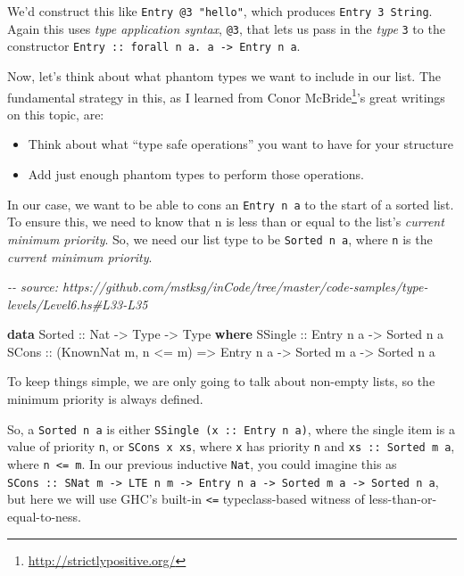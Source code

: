 \documentclass[]{article}
\newenvironment{Shaded}{}{}
\newcommand{\CommentTok}[1]{\textcolor[rgb]{0.38,0.63,0.69}{\textit{#1}}}
\newcommand{\DataTypeTok}[1]{\textcolor[rgb]{0.56,0.13,0.00}{#1}}
\newcommand{\KeywordTok}[1]{\textcolor[rgb]{0.00,0.44,0.13}{\textbf{#1}}}
\newcommand{\NormalTok}[1]{#1}
\newcommand{\OperatorTok}[1]{\textcolor[rgb]{0.40,0.40,0.40}{#1}}
\newcommand{\OtherTok}[1]{\textcolor[rgb]{0.00,0.44,0.13}{#1}}
\renewcommand{\href}[2]{#2\footnote{\url{#1}}}
\begin{document}
We'd construct this like \texttt{Entry\ @3\ "hello"}, which produces
\texttt{Entry\ 3\ String}. Again this uses \emph{type application syntax},
\texttt{@3}, that lets us pass in the \emph{type} \texttt{3} to the constructor
\texttt{Entry\ ::\ forall\ n\ a.\ a\ -\textgreater{}\ Entry\ n\ a}.

Now, let's think about what phantom types we want to include in our list. The
fundamental strategy in this, as I learned from
\href{http://strictlypositive.org/}{Conor McBride}'s great writings on this
topic, are:

\begin{itemize}
\tightlist
\item
  Think about what ``type safe operations'' you want to have for your structure
\item
  Add just enough phantom types to perform those operations.
\end{itemize}

In our case, we want to be able to cons an \texttt{Entry\ n\ a} to the start of
a sorted list. To ensure this, we need to know that n is less than or equal to
the list's \emph{current minimum priority}. So, we need our list type to be
\texttt{Sorted\ n\ a}, where \texttt{n} is the \emph{current minimum priority}.

\begin{Shaded}
\begin{Highlighting}[]
\CommentTok{{-}{-} source: https://github.com/mstksg/inCode/tree/master/code{-}samples/type{-}levels/Level6.hs\#L33{-}L35}

\KeywordTok{data} \DataTypeTok{Sorted}\OtherTok{ ::} \DataTypeTok{Nat} \OtherTok{{-}\textgreater{}} \DataTypeTok{Type} \OtherTok{{-}\textgreater{}} \DataTypeTok{Type} \KeywordTok{where}
  \DataTypeTok{SSingle}\OtherTok{ ::} \DataTypeTok{Entry}\NormalTok{ n a }\OtherTok{{-}\textgreater{}} \DataTypeTok{Sorted}\NormalTok{ n a}
  \DataTypeTok{SCons}\OtherTok{ ::}\NormalTok{ (}\DataTypeTok{KnownNat}\NormalTok{ m, n }\OperatorTok{\textless{}=}\NormalTok{ m) }\OtherTok{=\textgreater{}} \DataTypeTok{Entry}\NormalTok{ n a }\OtherTok{{-}\textgreater{}} \DataTypeTok{Sorted}\NormalTok{ m a }\OtherTok{{-}\textgreater{}} \DataTypeTok{Sorted}\NormalTok{ n a}
\end{Highlighting}
\end{Shaded}

To keep things simple, we are only going to talk about non-empty lists, so the
minimum priority is always defined.

So, a \texttt{Sorted\ n\ a} is either \texttt{SSingle\ (x\ ::\ Entry\ n\ a)},
where the single item is a value of priority \texttt{n}, or
\texttt{SCons\ x\ xs}, where \texttt{x} has priority \texttt{n} and
\texttt{xs\ ::\ Sorted\ m\ a}, where \texttt{n\ \textless{}=\ m}. In our
previous inductive \texttt{Nat}, you could imagine this as
\texttt{SCons\ ::\ SNat\ m\ -\textgreater{}\ LTE\ n\ m\ -\textgreater{}\ Entry\ n\ a\ -\textgreater{}\ Sorted\ m\ a\ -\textgreater{}\ Sorted\ n\ a},
but here we will use GHC's built-in \texttt{\textless{}=} typeclass-based
witness of less-than-or-equal-to-ness.
\end{document}
